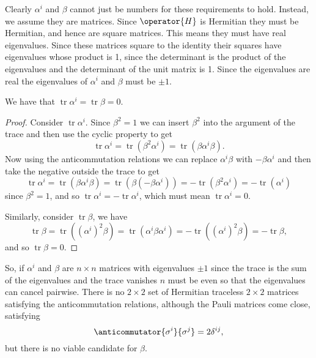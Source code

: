 \documentclass[fleqn]{NotesClass}
\DeclareMathOperator{\tr}{tr}
\begin{document}
\begin{appendices}
        Clearly \(\alpha^i\) and \(\beta\) cannot just be numbers for these requirements to hold.
        Instead, we assume they are matrices.
        Since \(\operator{H}\) is Hermitian they must be Hermitian, and hence are square matrices.
        This means they must have real eigenvalues.
        Since these matrices square to the identity their squares have eigenvalues whose product is 1, since the determinant is the product of the eigenvalues and the determinant of the unit matrix is 1.
        Since the eigenvalues are real the eigenvalues of \(\alpha^i\) and \(\beta\) must be \(\pm 1\).
        \begin{lma}{}{}
            We have that \(\tr \alpha^i = \tr \beta = 0\).
            \begin{proof}
                Consider \(\tr\alpha^i\).
                Since \(\beta^2 = 1\) we can insert \(\beta^2\) into the argument of the trace and then use the cyclic property to get
                \begin{equation}
                    \tr \alpha^i = \tr(\beta^2\alpha^i) = \tr(\beta\alpha^i\beta).
                \end{equation}
                Now using the anticommutation relations we can replace \(\alpha^i\beta\) with \(-\beta\alpha^i\) and then take the negative outside the trace to get
                \begin{equation}
                    \tr \alpha^i = \tr(\beta\alpha^i\beta) = \tr(\beta(-\beta\alpha^i)) = -\tr(\beta^2\alpha^i) = -\tr(\alpha^i)
                \end{equation}
                since \(\beta^2 = 1\), and so \(\tr\alpha^i = -\tr\alpha^i\), which must mean \(\tr\alpha^i = 0\).
                
                Similarly, consider \(\tr\beta\), we have
                \begin{equation}
                    \tr\beta = \tr((\alpha^i)^2\beta) = \tr(\alpha^i\beta\alpha^i) = -\tr((\alpha^i)^2\beta) = -\tr \beta,
                \end{equation}
                and so \(\tr\beta = 0\).
            \end{proof}
        \end{lma}
        
        So, if \(\alpha^i\) and \(\beta\) are \(n \times n\) matrices with eigenvalues \(\pm 1\) since the trace is the sum of the eigenvalues and the trace vanishes \(n\) must be even so that the eigenvalues can cancel pairwise.
        There is no \(2\times 2\) set of Hermitian traceless \(2\times 2\) matrices satisfying the anticommutation relations, although the Pauli matrices come close, satisfying
        \begin{equation}
            \anticommutator{\sigma^i}{\sigma^j} = 2\delta^{ij},
        \end{equation}
        but there is no viable candidate for \(\beta\).
        

\end{appendices}
\end{document}

